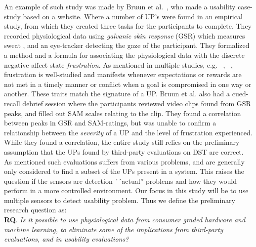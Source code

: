 An example of such study was made by Bruun et al.~\cite{LH-paper}, who made a usability case-study based on a website.
Where a number of UP's were found in an empirical study, from which they created three tasks for the participants to complete.
They recorded physiological data using \textit{galvanic skin response} (GSR) which measures sweat \cite{gsr_calibration}, and an eye-tracker detecting the gaze of the participant.
They formalized a method and a formula for associating the physiological data with the discrete negative affect state \textit{frustration}.
As mentioned in multiple studies, e.g. ~\cite{LH-paper}, ~\cite{frustration_with_computers}, frustration is well-studied
and manifests whenever expectations or rewards are not met in a timely manner or conflict when a goal is compromised in one way or another. These traits match the signature of a UP.
Bruun et al. also had a cued-recall debrief session where the participants reviewed video clips found from GSR peaks, and filled out SAM scales relating to the clip. 
They found a correlation between peaks in GSR and SAM-ratings, but was unable to confirm a relationship between the
\textit{severity} of a UP and the level of frustration experienced.
While they found a correlation, the entire study still relies on the preliminary assumption that the UPs found by third-party evaluations on DST are correct. 
As mentioned such evaluations suffers from various problems, and are generally only considered to find a subset of the UPs present in a system. 
This raises the question if the sensors are detection ´´actual'' problems and how they would perform in a more controlled environment.
Our focus in this study will be to use multiple sensors to detect usability problem. 
Thus we define the preliminary research question as:\\

\textbf{RQ}. \textit{Is it possible to use physiological data from consumer graded hardware and machine learning, to
  eliminate some of the implications from third-party evaluations, and in usability evaluations?}

